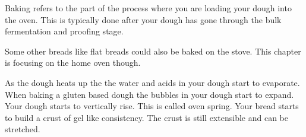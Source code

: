 Baking refers to the part of the process where you are loading
your dough into the oven. This is typically done after your
dough has gone through the bulk fermentation and proofing stage.

Some other breads like flat breads
could also be baked on the stove. This chapter is focusing on the
home oven though.

As the dough heats up the the water and acids
in your dough start to evaporate. When baking
a gluten based dough the bubbles in your dough start to expand.
Your dough starts to vertically rise. This is called oven spring.
Your bread starts to build a crust of gel like consistency. The crust is still
extensible and can be stretched.

\begin{table}[!htb]
  \centering
\end{table}
